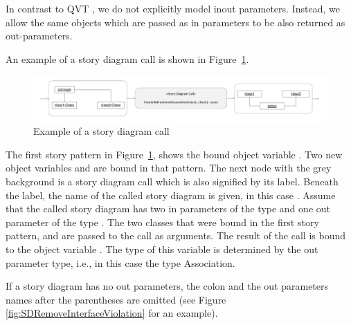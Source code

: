 In contrast to QVT \cite{QVT}, we do not explicitly model inout parameters. Instead, we allow the same objects which are passed as in parameters to be also returned as out-parameters.

An example of a story diagram call is shown in Figure~\ref{fig:call}.

\begin{figure}[htb]
\begin{center}
  \includegraphics[width=\textwidth]{figures/StoryDiagramCall}
  \caption{Example of a story diagram call}
  \label{fig:call}
\end{center}
\end{figure}

The first story pattern in Figure~\ref{fig:call}, shows the bound object variable . Two new object variables  and  are bound in that pattern. The next node with the grey background is a story diagram call which is also signified by its label. Beneath the label, the name of the called story diagram is given, in this case . Assume that the called story diagram has two in parameters of the type  and one out parameter of the type . The two classes that were bound in the first story pattern,  and  are passed to the call as arguments.
The result of the call is bound to the object variable . The type of this variable is determined by the out parameter type, i.e., in this case the type Association.

If a story diagram has no out parameters, the colon and the out parameters names after the parentheses are omitted (see Figure \ref{fig:SDRemoveInterfaceViolation} for an example).

